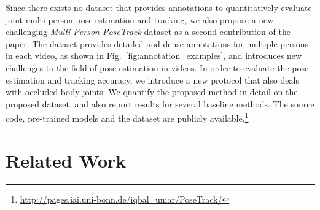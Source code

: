 \documentclass[10pt,twocolumn,letterpaper]{article}
\begin{document}
Since there exists no dataset that provides annotations to quantitatively evaluate joint multi-person pose estimation and tracking, we also propose a new challenging \emph{Multi-Person PoseTrack} dataset as a second contribution of the paper. The dataset provides detailed and dense annotations for multiple persons in each video, as shown in Fig.~\ref{fig:annotation_examples}, and introduces new challenges to the field of pose estimation in videos. In order to evaluate the pose estimation and tracking accuracy, we introduce a new protocol that also deals with occluded body joints. We quantify the proposed method in detail on the proposed dataset, and also report results for several baseline methods.
The source code, pre-trained models and the dataset are publicly available.\footnote{\url{http://pages.iai.uni-bonn.de/iqbal_umar/PoseTrack/}} 


\section{Related Work}
\end{document}
